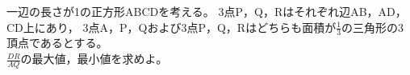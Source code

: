 \documentclass[../../main.tex]{subfiles}
\begin{document}
一辺の長さが1の正方形ABCDを考える。
3点P，Q，Rはそれぞれ辺AB，AD，CD上にあり，
3点A，P，Qおよび3点P，Q，Rはどちらも面積が$\displaystyle\frac{1}{3}$の三角形の3頂点であるとする。\\
$\displaystyle\frac{DR}{AQ}$の最大値，最小値を求めよ。
\end{document}

